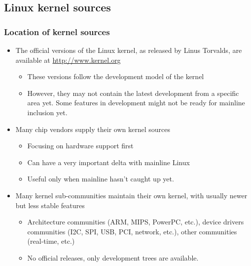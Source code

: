 \subsection{Linux kernel sources}

\begin{frame}
  \frametitle{Location of kernel sources}
  \begin{itemize}
  \item The official versions of the Linux kernel, as released by Linus
    Torvalds, are available at \url{http://www.kernel.org}
    \begin{itemize}
    \item These versions follow the development model of the kernel
    \item However, they may not contain the latest development from a
      specific area yet. Some features in development might not be
      ready for mainline inclusion yet.
    \end{itemize}
  \item Many chip vendors supply their own kernel sources
    \begin{itemize}
    \item Focusing on hardware support first
    \item Can have a very important delta with mainline Linux
    \item Useful only when mainline hasn't caught up yet.
    \end{itemize}
  \item Many kernel sub-communities maintain their own kernel, with
    usually newer but less stable features
    \begin{itemize}
    \item Architecture communities (ARM, MIPS, PowerPC, etc.), device
      drivers communities (I2C, SPI, USB, PCI, network, etc.), other
      communities (real-time, etc.)
    \item No official releases, only development trees are available.
    \end{itemize}
  \end{itemize}
\end{frame}

